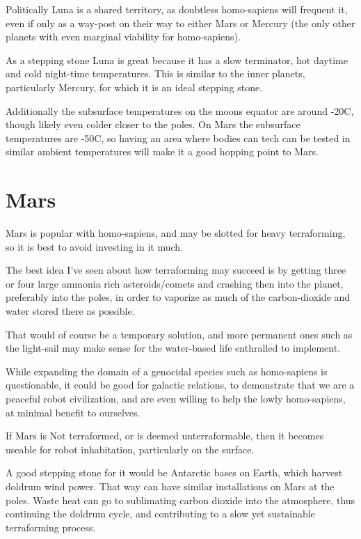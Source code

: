 Politically Luna is a shared territory, as doubtless homo-sapiens will frequent
it, even if only as a way-post on their way to either Mars or Mercury (the only
other planets with even marginal viability for homo-sapiens). 

As a stepping stone Luna is great because it has a slow terminator, hot daytime
and cold night-time temperatures. This is similar to the inner planets,
particularly Mercury, for which it is an ideal stepping stone. 

Additionally the subsurface temperatures on the moons equator are around -20C, 
though likely even colder closer to the poles.  On Mars the subsurface
temperatures are -50C, so having an area where bodies can tech can be tested in
similar ambient temperatures will make it a good hopping point to Mars.


\section{Mars}

Mars is popular with homo-sapiens, and may be slotted for heavy terraforming,
 so it is best to avoid investing in it much. 

The best idea I've seen about how terraforming may succeed is by getting three
or four large ammonia rich asteroids/comets and crashing then into the planet,
preferably into the poles, in order to vaporize as much of the carbon-dioxide
and water stored there as possible. 

That would of course be a temporary solution, and more permanent ones such as
the light-sail may make sense for the water-based life enthralled to implement. 

While expanding the domain of a genocidal species such as homo-sapiens is
questionable, it could be good for galactic relations, to demonstrate that we
are a peaceful robot civilization, and are even willing to help the lowly
homo-sapiens, at minimal benefit to ourselves. 

If Mars is Not terraformed, or is deemed unterraformable, then it becomes
useable for robot inhabitation, particularly on the surface. 

A good stepping stone for it would be Antarctic bases on Earth, which harvest
doldrum wind power. That way can have similar installations on Mars at the
poles. Waste heat can go to sublimating carbon dioxide into the atmosphere, thus
continuing the doldrum cycle, and contributing to a slow yet sustainable 
terraforming process. 

